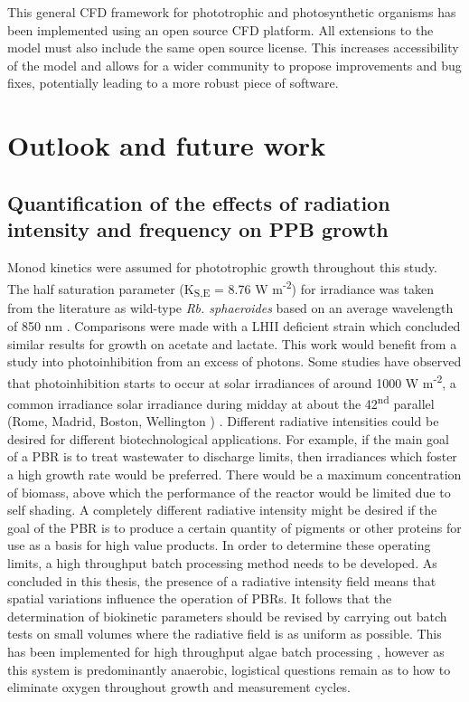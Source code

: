 \skippingparagraph
This general CFD framework for phototrophic and photosynthetic organisms has been implemented using an open source CFD platform. All extensions to the model must also include the same open source license. This increases accessibility of the model and allows for a wider community to propose improvements and bug fixes, potentially leading to a more robust piece of software. 




\section{Outlook and future work}
\subsection{Quantification of the effects of radiation intensity and frequency on PPB growth}
Monod kinetics were assumed for phototrophic growth throughout this study. The half saturation parameter (K\textsubscript{S,E} = 8.76 W m\textsuperscript{-2}) for irradiance was taken from the literature as wild-type \textit{Rb. sphaeroides} based on an average wavelength of 850 nm \cite{eltsova2016}. Comparisons were made with a LHII deficient strain which concluded similar results for growth on acetate and lactate. This work would benefit from a study into photoinhibition from an excess of photons. Some studies have observed that photoinhibition starts to occur at solar irradiances of around 1000 W m\textsuperscript{-2}, a common irradiance solar irradiance during midday at about the 42\textsuperscript{nd} parallel (Rome, Madrid, Boston, Wellington \etc) \cite{adessi2014a,miyake1999}. 
\skippingparagraph
Different radiative intensities could be desired for different biotechnological applications. For example, if the main goal of a PBR is to treat wastewater to discharge limits, then irradiances which foster a high growth rate would be preferred. There would be a maximum concentration of biomass, above which the performance of the reactor would be limited due to self shading. A completely different radiative intensity might be desired if the goal of the PBR is to produce a certain quantity of pigments or other proteins for use as a basis for high value products.
\skippingparagraph
In order to determine these operating limits, a high throughput batch processing method needs to be developed. As concluded in this thesis, the presence of a radiative intensity field means that spatial variations influence the operation of PBRs. It follows that the determination of biokinetic parameters should be revised by carrying out batch tests on small volumes where the radiative field is as uniform as possible. This has been implemented for high throughput algae batch processing \cite{vanwagenen2014}, however as this system is predominantly anaerobic, logistical questions remain as to how to eliminate oxygen throughout growth and measurement cycles.
